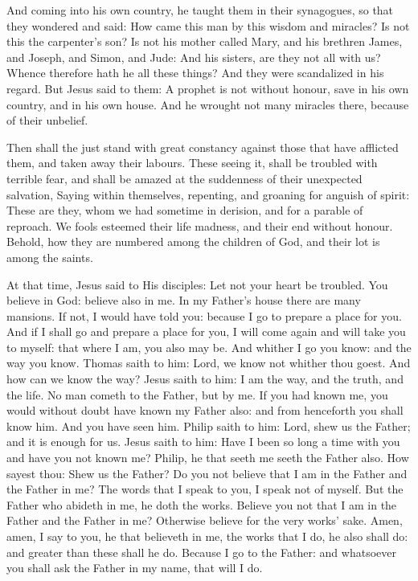 And coming into his own country, he taught them in their
synagogues, so that they wondered and said: How came this man by this
wisdom and miracles?
Is not this the carpenter's son? Is not his mother called Mary,
and his brethren James, and Joseph, and Simon, and Jude:
And his sisters, are they not all with us? Whence therefore hath
he all these things?
And they were scandalized in his regard. But Jesus said to them:
A prophet is not without honour, save in his own country, and in his own
house.
And he wrought not many miracles there, because of their
unbelief.


\bigskip




Then shall the just stand with great constancy against those that
have afflicted them, and taken away their labours.
These seeing it, shall be troubled with terrible fear, and shall be
amazed at the suddenness of their unexpected salvation,
Saying within themselves, repenting, and groaning for anguish of
spirit: These are they, whom we had sometime in derision, and for a
parable of reproach.
We fools esteemed their life madness, and their end without honour.
Behold, how they are numbered among the children of God, and their
lot is among the saints.



At that time, Jesus said to His disciples: Let not your heart be troubled. You believe in God: believe also
in me.
In my Father's house there are many mansions. If not, I would have
told you: because I go to prepare a place for you.
And if I shall go and prepare a place for you, I will come again
and will take you to myself: that where I am, you also may be.
And whither I go you know: and the way you know.
Thomas saith to him: Lord, we know not whither thou goest.  And
how can we know the way?
Jesus saith to him: I am the way, and the truth, and the life. No
man cometh to the Father, but by me.
If you had known me, you would without doubt have known my Father
also: and from henceforth you shall know him. And you have seen him.
Philip saith to him: Lord, shew us the Father; and it is enough
for us.
Jesus saith to him: Have I been so long a time with you and have
you not known me? Philip, he that seeth me seeth the Father also. How
sayest thou: Shew us the Father?
Do you not believe that I am in the Father and the Father in me?
The words that I speak to you, I speak not of myself.  But the Father
who abideth in me, he doth the works.
Believe you not that I am in the Father and the Father in me?
Otherwise believe for the very works' sake. Amen, amen, I say to
you, he that believeth in me, the works that I do, he also shall do: and
greater than these shall he do.
Because I go to the Father: and whatsoever you shall ask the
Father in my name, that will I do.


